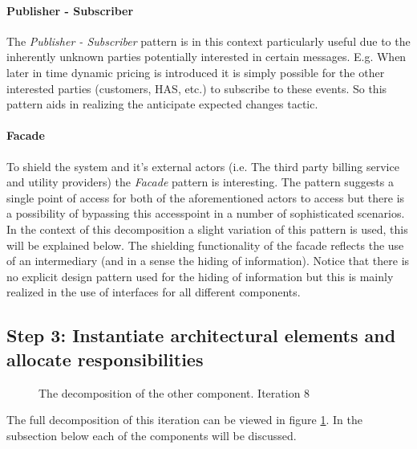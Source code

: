 \paragraph{Publisher - Subscriber}

\npar The \emph{Publisher - Subscriber} pattern is in this context particularly useful due to
the inherently unknown parties potentially interested in certain messages. E.g. When
later in time dynamic pricing is introduced it is simply possible for the other
interested parties (customers, HAS, etc.) to subscribe to these events. So this
pattern aids in realizing the anticipate expected changes tactic.

\paragraph{Facade}

\npar To shield the system and it's external actors (i.e. The third party
billing service and utility providers) the \emph{Facade} pattern is interesting.
The pattern suggests a single point of access for both of the aforementioned
actors to access but there is a possibility of bypassing this accesspoint in a
number of sophisticated scenarios. In the context of this decomposition a slight
variation of this pattern is used, this will be explained below. The shielding
functionality of the facade reflects the use of an intermediary (and in a sense
the hiding of information). Notice that there is no explicit design pattern used
for the hiding of information but this is mainly realized in the use of
interfaces for all different components.

\subsection{Step 3: Instantiate architectural elements and allocate responsibilities}
\label{add:it8/elements}

\begin{figure}[H]
	\begin{centering}
		\caption{The decomposition of the other component. Iteration
		8}
		\label{fig:add/it8/decomposition}
	\end{centering}
\end{figure}

\npar The full decomposition of this iteration can be viewed in figure
\ref{fig:add/it8/decomposition}. In the subsection below each of the components
will be discussed. 

